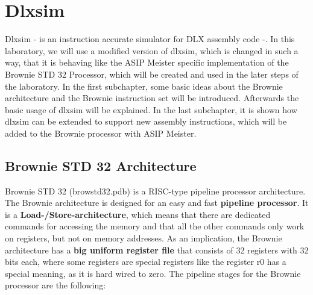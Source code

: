\hypertarget{dlxsim}{%
\chapter{Dlxsim}\label{dlxsim}}

Dlxsim \cite{DLX-Package}-\cite{DLXsim} is an instruction accurate simulator for DLX
assembly code \cite{Hennessy96}-\cite{Sailer96}. In this laboratory, we will use a modified version of
dlxsim, which is changed in such a way, that it is behaving like the
ASIP Meister specific implementation of the Brownie STD 32 Processor,
which will be created and used in the later steps of the laboratory. In
the first subchapter, some basic ideas about the Brownie architecture
and the Brownie instruction set will be introduced. Afterwards the basic
usage of dlxsim will be explained. In the last subchapter, it is shown
how dlxsim can be extended to support new assembly instructions, which
will be added to the Brownie processor with ASIP Meister.

\hypertarget{brownie-std-32-architecture}{%
\section{Brownie STD 32
Architecture}\label{brownie-std-32-architecture}}
Brownie STD 32 (browstd32.pdb) is a RISC-type pipeline processor
architecture. The Brownie architecture is designed for an easy and fast
\textbf{pipeline processor}. It is a \textbf{Load-/Store-architecture},
which means that there are dedicated commands for accessing the memory
and that all the other commands only work on registers, but not on
memory addresses. As an implication, the Brownie architecture has a
\textbf{big uniform register file} that consists of 32 registers with 32
bits each, where some registers are special registers like the register
r0 has a special meaning, as it is hard wired to zero. The pipeline
stages for the Brownie processor are the following:

